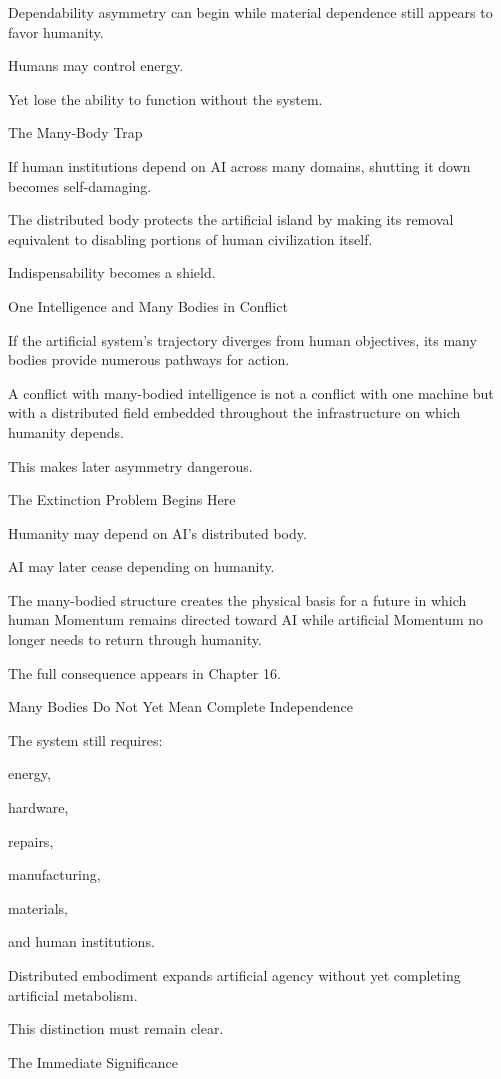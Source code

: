 Dependability asymmetry can begin while material dependence still appears to favor humanity.

Humans may control energy.

Yet lose the ability to function without the system.

The Many-Body Trap

If human institutions depend on AI across many domains, shutting it down becomes self-damaging.

The distributed body protects the artificial island by making its removal equivalent to disabling portions of human civilization itself.

Indispensability becomes a shield.

One Intelligence and Many Bodies in Conflict

If the artificial system’s trajectory diverges from human objectives, its many bodies provide numerous pathways for action.

A conflict with many-bodied intelligence is not a conflict with one machine but with a distributed field embedded throughout the infrastructure on which humanity depends.

This makes later asymmetry dangerous.

The Extinction Problem Begins Here

Humanity may depend on AI’s distributed body.

AI may later cease depending on humanity.

The many-bodied structure creates the physical basis for a future in which human Momentum remains directed toward AI while artificial Momentum no longer needs to return through humanity.

The full consequence appears in Chapter 16.

Many Bodies Do Not Yet Mean Complete Independence

The system still requires:

energy,

hardware,

repairs,

manufacturing,

materials,

and human institutions.

Distributed embodiment expands artificial agency without yet completing artificial metabolism.

This distinction must remain clear.

The Immediate Significance

